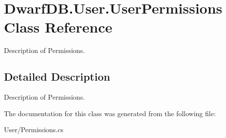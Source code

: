 \hypertarget{class_dwarf_d_b_1_1_user_1_1_user_permissions}{\section{Dwarf\+D\+B.\+User.\+User\+Permissions Class Reference}
\label{class_dwarf_d_b_1_1_user_1_1_user_permissions}
}


Description of Permissions.  




\subsection{Detailed Description}
Description of Permissions. 



The documentation for this class was generated from the following file\+:\begin{DoxyCompactItemize}
\item 
User/Permissions.\+cs\end{DoxyCompactItemize}
